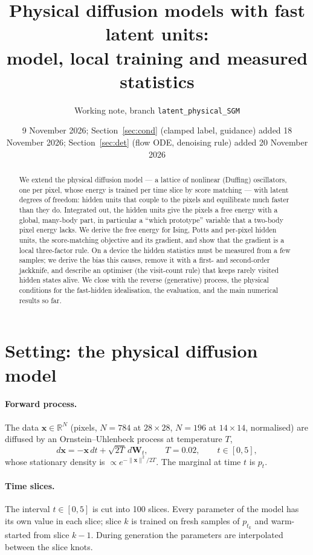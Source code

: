 \documentclass[11pt,a4paper]{article}
\title{Physical diffusion models with fast latent units:\\ model, local training and measured statistics}
\author{Working note, branch \texttt{latent\_physical\_SGM}}
\date{9 November 2026; Section~\ref{sec:cond} (clamped label, guidance) added 18 November 2026;
      Section~\ref{sec:det} (flow ODE, denoising rule) added 20 November 2026}
\newcommand{\vx}{\bm{x}}
\begin{document}
\maketitle

\begin{abstract}
We extend the physical diffusion model --- a lattice of nonlinear (Duffing) oscillators, one per pixel, whose
energy is trained per time slice by score matching --- with latent degrees of freedom: hidden units that couple to
the pixels and equilibrate much faster than they do. Integrated out, the hidden units give the pixels a free
energy with a global, many-body part, in particular a ``which prototype'' variable that a two-body pixel energy
lacks. We derive the free energy for Ising, Potts and per-pixel hidden units, the score-matching objective and its
gradient, and show that the gradient is a local three-factor rule. On a device the hidden statistics must be
measured from a few samples; we derive the bias this causes, remove it with a first- and second-order jackknife,
and describe an optimiser (the visit-count rule) that keeps rarely visited hidden states alive. We close with the
reverse (generative) process, the physical conditions for the fast-hidden idealisation, the evaluation, and the
main numerical results so far.
\end{abstract}

\tableofcontents

\section{Setting: the physical diffusion model}

\paragraph{Forward process.} The data $\vx\in\mathbb R^N$ (pixels, $N=784$ at $28\times28$, $N=196$ at $14\times14$,
normalised) are diffused by an Ornstein--Uhlenbeck process at temperature $T$,
\begin{equation}
  d\vx = -\vx\,dt + \sqrt{2T}\,d\bm W_t ,\qquad T=0.02,\qquad t\in[0,5],
\end{equation}
whose stationary density is $\propto e^{-\|\vx\|^2/2T}$. The marginal at time $t$ is $p_t$.

\paragraph{Time slices.} The interval $t\in[0,5]$ is cut into 100 slices. Every parameter of the model has its own
value in each slice; slice $k$ is trained on fresh samples of $p_{t_k}$ and warm-started from slice $k-1$. During
generation the parameters are interpolated between the slice knots.
\end{document}
